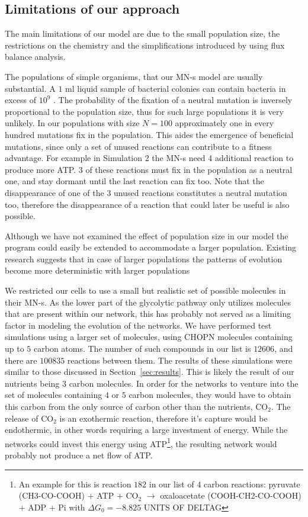 \documentclass[a4paper,12pt]{article}
\begin{document}
\subsection{Limitations of our approach}
\label{sub:limitations}


The main limitations of our model are due to the small population size, the restrictions on the chemistry and the simplifications introduced by using flux balance analysis. 

The populations of simple organisms, that our MN-s model are usually substantial. A $1$ ml liquid sample of bacterial colonies can contain bacteria in excess of $10^9$ \cite{barteklecture}. The probability of the fixation of a neutral mutation is inversely proportional to the population size, thus for such large populations it is very unlikely. In our populations with size $N=100$ approximately one in every hundred mutations fix in the population. This aides the emergence of beneficial mutations, since only a set of unused reactions can contribute to a fitness advantage. For example in Simulation 2 the MN-s need 4 additional reaction to produce more ATP. $3$ of these reactions must fix in the population as a neutral one, and stay dormant until the last reaction can fix too. Note that the disappearance of one of the $3$ unused reactions constitutes a neutral mutation too, therefore the disappearance of a reaction that could later be useful is also possible.

Although we have not examined the effect of population size in our model the program could easily be extended to accommodate a larger population. Existing research suggests that in case of larger populations the patterns of evolution become more deterministic with larger populations \cite{predictability}


We restricted our cells to use a small but realistic set of possible molecules in their MN-s. As the lower part of the glycolytic pathway only utilizes molecules that are present within our network, this has probably not served as a limiting factor in modeling the evolution of the networks. We have performed test simulations using a larger set of molecules, using CHOPN molecules containing up to $5$ carbon atoms. The number of such compounds in our list is $12606$, and there are $100 835$ reactions between them. The results of these simulations were similar to those discussed in Section~\ref{sec:results}. This is likely the result of our nutrients being $3$ carbon molecules. In order for the networks to venture into the set of molecules containing $4$ or $5$ carbon molecules, they would have to obtain this carbon from the only source of carbon other than the nutrients,  CO$_2$. The release of CO$_2$ is an exothermic reaction, therefore it's capture would be endothermic, in other words requiring a large investment of energy. While the networks could invest this energy using ATP\footnote{ An example for this is reaction $182$ in our list of $4$ carbon reactions: pyruvate (CH3-CO-COOH) $+$ ATP $+$ CO$_2$ $\rightarrow$   oxaloacetate (COOH-CH2-CO-COOH) $+$ ADP $+$ Pi with $\Delta G_0=-8.825$ UNITS OF DELTAG}, the resulting network would probably not produce a net flow of ATP. 
\end{document}

